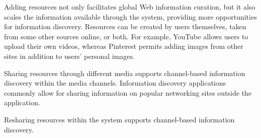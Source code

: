 {{Adding resources not only facilitates global Web information curation, but it also scales the information available through the system, providing more opportunities for information discovery. Resources can be created by users themselves, taken from some other sources online, or both. For example, YouTube allows users to upload their own videos, whereas Pinterest permits adding images from other sites in addition to users' personal images. 

Sharing resources through different media supports channel-based information discovery within the media channels. Information discovery applications commonly allow for sharing information on popular networking sites outside the application.

Resharing resources within the system supports channel-based information discovery. 
} %



} %


